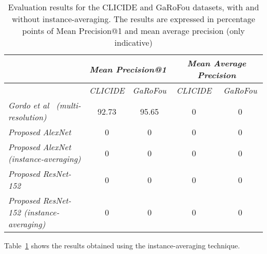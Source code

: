 \begin{table}
\begin{tabular}{|l|c|c|c|c|}
\hline & \multicolumn{2}{c|}{\emph{Mean Precision@1}} &
\multicolumn{2}{c|}{\emph{Mean Average Precision}}\\
\hline & \emph{CLICIDE} & \emph{GaRoFou} & \emph{CLICIDE} & \emph{GaRoFou}\\
\hline \emph{Gordo et al~\cite{gordo_deep_2016} (multi-resolution)}
& 92.73 & 95.65 & 0 & 0\\
\hline \emph{Proposed AlexNet} & 0 & 0 & 0 & 0\\ %
\hline \emph{Proposed AlexNet (instance-averaging)} & 0 & 0 & 0 & 0\\ %
\hline \emph{Proposed ResNet-152} & 0 & 0 & 0 & 0\\
\hline \emph{Proposed ResNet-152 (instance-averaging)} & 0 & 0 & 0 & 0\\
\hline
\end{tabular}
\caption{Evaluation results for the CLICIDE and GaRoFou datasets,
with and without instance-averaging.
The results are expressed in percentage points of
Mean Precision@1 and mean average precision (only indicative)
\label{tab:instanceavg}}
\end{table}

Table~\ref{tab:instanceavg} shows the results obtained
using the instance-averaging technique. %
